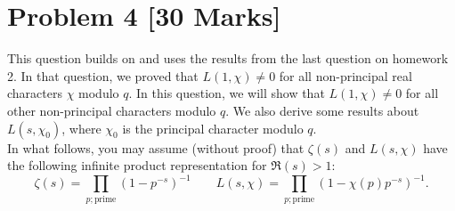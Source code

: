 \documentclass[12pt]{article}
\begin{document}
\section*{Problem 4 [30 Marks]} 
This question builds on and uses the results from the last question on homework 2. In that question, we proved that $L(1,\chi)\neq 0$ for all non-principal real characters $\chi$ modulo $q$. In this question, we will show that $L(1,\chi)\neq 0$ for all other non-principal characters modulo $q$. We also derive some results about $L(s,\chi_0)$, where $\chi_0$ is the principal character modulo $q$.\\
In what follows, you may assume (without proof) that $\zeta(s)$ and $L(s,\chi)$ have the following infinite product representation for $\Re(s)>1$:
\[
    \zeta(s)=\prod_{p;\text{prime}}(1-p^{-s})^{-1}\quad\quad L(s,\chi)=\prod_{p;\text{prime}}(1-\chi(p)p^{-s})^{-1}.
\]
\end{document}
